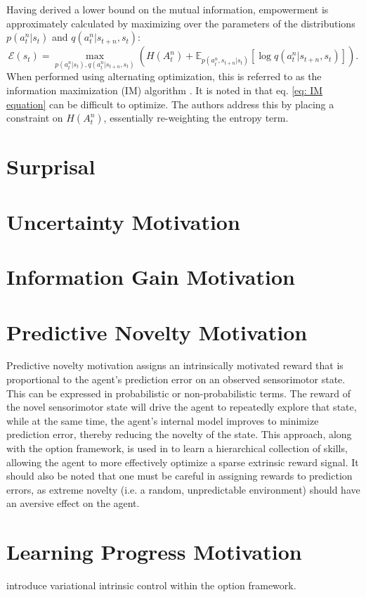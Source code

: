 Having derived a lower bound on the mutual information, empowerment is approximately calculated by maximizing over the parameters of the distributions $p(a^n_t | s_t)$ and $q(a^n_t | s_{t+n}, s_t)$:
\begin{equation}
    \mathcal{E} (s_t) = \max_{p (a^n_t | s_t), q(a^n_t | s_{t+n}, s_t)} \left( H(A^n_t) + \mathbb{E}_{p(a^n_t , s_{t+n} | s_t)} \left[ \log q(a^n_t | s_{t+n}, s_t) \right] \right).
    \label{eq: IM equation}
\end{equation}
When performed using alternating optimization, this is referred to as the information maximization (IM) algorithm \cite{barber2003algorithm}. It is noted in \cite{mohamed2015variational} that eq. \ref{eq: IM equation} can be difficult to optimize. The authors address this by placing a constraint on $H(A^n_t)$, essentially re-weighting the entropy term.


\section{Surprisal}



\section{Uncertainty Motivation}

\section{Information Gain Motivation}

\section{Predictive Novelty Motivation}

Predictive novelty motivation assigns an intrinsically motivated reward that is proportional to the agent's prediction error on an observed sensorimotor state. This can be expressed in probabilistic or non-probabilistic terms. The reward of the novel sensorimotor state will drive the agent to repeatedly explore that state, while at the same time, the agent's internal model improves to minimize prediction error, thereby reducing the novelty of the state. This approach, along with the option framework, is used in \cite{barto2004intrinsically} to learn a hierarchical collection of skills, allowing the agent to more effectively optimize a sparse extrinsic reward signal. It should also be noted that one must be careful in assigning rewards to prediction errors, as extreme novelty (i.e. a random, unpredictable environment) should have an aversive effect on the agent.

\section{Learning Progress Motivation}

\noindent \cite{gregor2016variational} introduce variational intrinsic control within the option framework.

